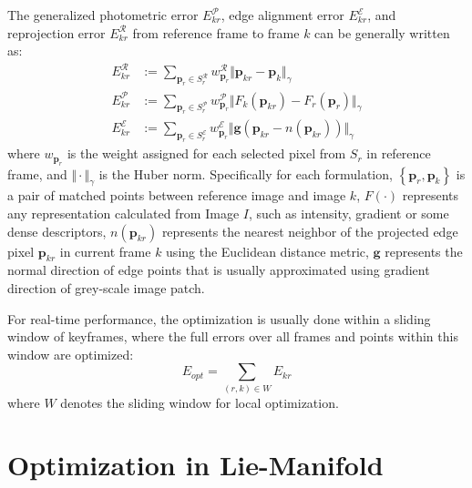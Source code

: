 The generalized photometric error $E_{kr}^{\mathcal{P}}$, edge alignment error $E_{kr}^{\mathcal{E}}$, and reprojection error $E_{kr}^{\mathcal{R}}$ from reference frame to frame $k$ can be generally written as:
\begin{align} 
E_{kr}^{\mathcal{R}} &:=  \sum_{\mathbf{p}_{r} \in \mathit{S}_r^{\mathcal{R}} } w_{\mathbf{p}_r}^{\mathcal{R}} \Vert \mathbf{p}_{kr} - \mathbf{p}_{k} \Vert_{\gamma}  \label{eq:preliminaries_reprojectionerror} \\
E_{kr}^{\mathcal{P}} &:= \sum_{\mathbf{p}_r \in \mathit{S}_r^{\mathcal{P}}} w_{\mathbf{p}_r}^{\mathcal{P}} \Vert F_{k} ( \mathbf{p}_{kr}) - F_{r}(\mathbf{p}_r) \Vert_{\gamma} \label{eq:preliminaries_photometricerror} \\ 
E_{kr}^{\mathcal{E}} &:=  \sum_{\mathbf{p}_{r} \in \mathit{S}_r^{\mathcal{E}} } w_{\mathbf{p}_r}^{\mathcal{E}} \Vert \mathbf{g}(\mathbf{p}_{kr} - \mathit{n}(\mathbf{p}_{kr})) \Vert_{\gamma}  \label{eq:preliminaries_edgeerror}
\end{align}
where $w_{\mathbf{p}_r}$ is the weight assigned for each selected pixel from $S_r$ in reference frame, and $\Vert \cdot \Vert_{\gamma}$ is the Huber norm. 
Specifically for each formulation, $\left \{ \mathbf{p}_{r},\mathbf{p}_{k} \right \}$ is a pair of matched points between reference image and image $k$, 
$F(\cdot)$ represents any representation calculated from Image $I$, such as intensity, gradient or some dense descriptors, 
$\mathit{n}(\mathbf{p}_{kr})$ represents the nearest neighbor of the projected edge pixel $\mathbf{p}_{kr}$ in current frame $k$ using the Euclidean distance metric, 
$\mathbf{g}$ represents the normal direction of edge points that is usually approximated using gradient direction of grey-scale image patch. 


For real-time performance, the optimization is usually done within a sliding window of keyframes, where the full errors over all frames and points within this window are optimized:
\begin{equation} \label{eq:preliminaries_opt}
E_{opt} = \sum_{(r,k)\in \mathit{W}} E_{kr}
\end{equation} 
where $\mathit{W}$ denotes the sliding window for local optimization. 
 
\section{Optimization in Lie-Manifold}
\label{sec:preliminaries_optimization}

